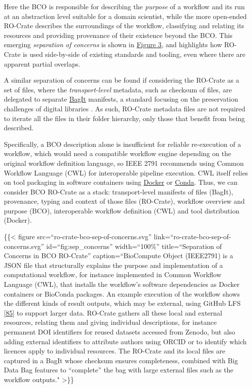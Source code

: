 {Here the BCO is responsible for describing the \emph{purpose} of a
workflow and its run at an abstraction level suitable for a domain
scientist, while the more open-ended RO-Crate describes the surroundings
of the workflow, classifying and relating its resources and providing
provenance of their existence beyond the BCO. This emerging
\emph{separation of concerns} is shown in
\protect\hyperlink{fig:sep_concerns}{Figure 3}, and highlights how
RO-Crate is used side-by-side of existing standards and tooling, even
where there are apparent partial overlaps.

A similar separation of concerns can be found if considering the
RO-Crate as a set of files, where the \emph{transport-level} metadata,
such as checksum of files, are delegated to separate
\href{https://www.researchobject.org/ro-crate/1.1/appendix/implementation-notes.html\#adding-ro-crate-to-bagit}{BagIt}
manifests, a standard focusing on the preservation challenges of digital
libraries \cite{ch5-74}. As such,
RO-Crate metadata files are not required to iterate all the files in
their folder hierarchy, only those that benefit from being described.

Specifically, a BCO description alone is insufficient for reliable
re-execution of a workflow, which would need a compatible workflow
engine depending on the original workflow definition language, so IEEE
2791 recommends using Common Workflow Language (CWL)
\cite{Crusoe 2022} for interoperable
pipeline execution. CWL itself relies on tool packaging in software
containers using \href{https://www.docker.com/}{Docker} or
\href{https://docs.conda.io/}{Conda}. Thus, we can consider BCO RO-Crate
as a stack: transport-level manifests of files (BagIt), provenance,
typing and context of those files (RO-Crate), workflow overview and
purpose (BCO), interoperable workflow definition (CWL) and tool
distribution (Docker).

\{\{\textless{} figure src=``ro-crate-bco-sep-of-concerns.svg''
link=``ro-crate-bco-sep-of-concerns.svg'' id=``fig:sep\_concerns''
width=``100\%'' title=``Separation of Concerns in BCO RO-Crate''
caption=``BioCompute Object (IEEE2791) is a JSON file that structurally
explains the purpose and implementation of a computational workflow, for
instance implemented in Common Workflow Language (CWL), that installs
the workflow's software dependencies as Docker containers or BioConda
packages. An example execution of the workflow shows the different kinds
of result outputs, which may be external, using GitHub LFS
\href{https://docs.github.com/en/repositories/working-with-files/managing-large-files}{{[}85{]}}
to support larger data. RO-Crate gathers all these local and external
resources, relating them and giving individual descriptions, for
instance permanent DOI identifiers for reused datasets accessed from
Zenodo, but also adding external identifiers to attribute authors using
ORCID or to identify which licences apply to individual resources. The
RO-Crate and its local files are captured in a BagIt whose checksum
ensures completeness, combined with Big Data Bag
\cite{Chard 2016}
features to ``complete'' the bag with large external files such as the
workflow outputs." \textgreater\}\}

}

